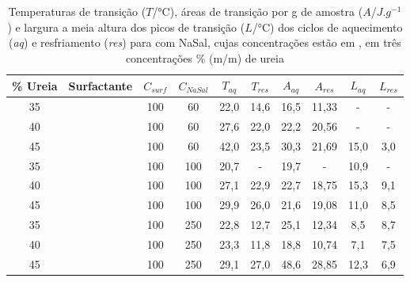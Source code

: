     \begin{table}[h]
      \IBGEtab%
      {\caption{Temperaturas de transição (\(T\)/°C), áreas de transição por g de amostra (\(A\)/\(J.g^{-1}\)) e largura a meia altura dos picos de transição (\(L\)/°C) dos ciclos de aquecimento (\emph{aq}) e resfriamento (\emph{res}) para \CTAB{} com NaSal, cujas concentrações estão em \mM, em três concentrações \% (m/m) de ureia}
      \label{tab:DSC_temp_areas_NaSal}}%
        {\begin{tabular}{cccccccccc}
        	\toprule
        	\% Ureia &      Surfactante      & \(C_{surf}\) & \(C_{NaSal}\) & \(T_{aq}\) & \(T_{res}\) & \(A_{aq}\) & \(A_{res}\) & \(L_{aq}\) & \(L_{res}\) \\ \midrule
        	   35    & \multirow{9}{*}{\CTAB} &    100     &     60      &   22,0   &   14,6    &   16,5   &   11,33   &    -     &     -     \\
        	   40    &                       &    100     &     60      &   27,6   &   22,0    &   22,2   &   20,56   &    -     &     -     \\
        	   45    &                       &    100     &     60      &   42,0   &   23,5    &   30,3   &   21,69   &   15,0   &    3,0    \\
        	   35    &                       &    100     &     100     &   20,7   &     -     &   19,7   &     -     &   10,9   &     -     \\
        	   40    &                       &    100     &     100     &   27,1   &   22,9    &   22,7   &   18,75   &   15,3   &    9,1    \\
        	   45    &                       &    100     &     100     &   29,9   &   26,0    &   21,6   &   19,08   &   11,0   &    8,5    \\
        	   35    &                       &    100     &     250     &   22,8   &   12,7    &   25,1   &   12,34   &   8,5    &    8,7    \\
        	   40    &                       &    100     &     250     &   23,3   &   11,8    &   18,8   &   10,74   &   7,1    &    7,5    \\
        	   45    &                       &    100     &     250     &   29,1   &   27,0    &   48,6   &   28,85   &   12,3   &    6,9    \\ \bottomrule
        \end{tabular}}%
            {}
    \end{table}

